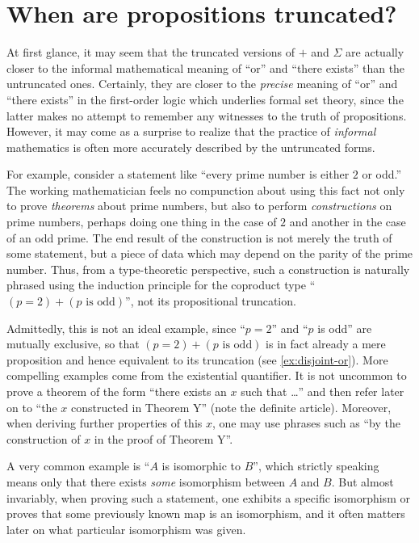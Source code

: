 %


\section{When are propositions truncated?}
\label{subsec:when-trunc}

%
%

At first glance, it may seem that the truncated versions of $+$ and $\Sigma$ are actually closer to the informal mathematical meaning of ``or'' and ``there exists'' than the untruncated ones.
Certainly, they are closer to the \emph{precise} meaning of ``or'' and ``there exists'' in the first-order logic which underlies formal set theory, since the latter makes no attempt to remember any witnesses to the truth of propositions.
However, it may come as a surprise to realize that the practice of \emph{informal} mathematics is often more accurately described by the untruncated forms.

%
For example, consider a statement like ``every prime number is either $2$ or odd.''
The working mathematician feels no compunction about using this fact not only to prove \emph{theorems} about prime numbers, but also to perform \emph{constructions} on prime numbers, perhaps doing one thing in the case of $2$ and another in the case of an odd prime.
The end result of the construction is not merely the truth of some statement, but a piece of data which may depend on the parity of the prime number.
Thus, from a type-theoretic perspective, such a construction is naturally phrased using the induction principle for the coproduct type ``$(p=2)+(p\text{ is odd})$'', not its propositional truncation.

Admittedly, this is not an ideal example, since ``$p=2$'' and ``$p$ is odd'' are mutually exclusive, so that $(p=2)+(p\text{ is odd})$ is in fact already a mere proposition and hence equivalent to its truncation (see \autoref{ex:disjoint-or}).
More compelling examples come from the existential quantifier.
It is not uncommon to prove a theorem of the form ``there exists an $x$ such that \dots'' and then refer later on to ``the $x$ constructed in Theorem Y'' (note the definite article).
Moreover, when deriving further properties of this $x$, one may use phrases such as ``by the construction of $x$ in the proof of Theorem Y''.

A very common example is ``$A$ is isomorphic to $B$'', which strictly speaking means only that there exists \emph{some} isomorphism between $A$ and $B$.
But almost invariably, when proving such a statement, one exhibits a specific isomorphism or proves that some previously known map is an isomorphism, and it often matters later on what particular isomorphism was given.

